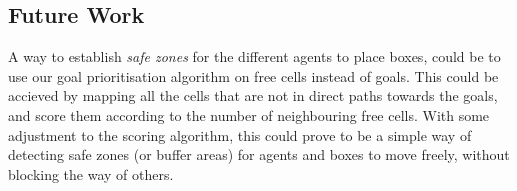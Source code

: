 \subsection{Future Work}
\label{sec:future work}





A way to establish \textit{safe zones} for the different agents to place boxes, could be to use our goal prioritisation algorithm on free cells instead of goals. 
This could be accieved by mapping all the cells that are not in direct paths towards the goals, and score them according to the number of neighbouring free cells. 
With some adjustment to the scoring algorithm, this could prove to be a simple way of detecting safe zones (or buffer areas) for agents and boxes to move freely, without blocking the way of others.
